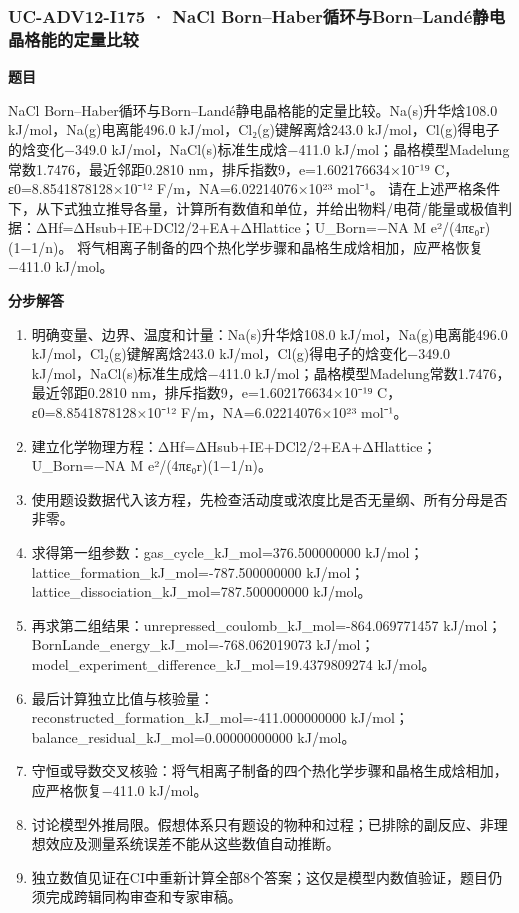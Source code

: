 \documentclass[UTF8,11pt,a4paper]{ctexart}
\begin{document}
\subsubsection*{UC-ADV12-I175 · NaCl Born–Haber循环与Born–Landé静电晶格能的定量比较}
\noindent\textbf{题目}\par
NaCl Born–Haber循环与Born–Landé静电晶格能的定量比较。Na(s)升华焓108.0 kJ/mol，Na(g)电离能496.0 kJ/mol，Cl₂(g)键解离焓243.0 kJ/mol，Cl(g)得电子的焓变化−349.0 kJ/mol，NaCl(s)标准生成焓−411.0 kJ/mol；晶格模型Madelung常数1.7476，最近邻距0.2810 nm，排斥指数9，e=1.602176634×10⁻¹⁹ C，ε0=8.8541878128×10⁻¹² F/m，NA=6.02214076×10²³ mol⁻¹。 请在上述严格条件下，从下式独立推导各量，计算所有数值和单位，并给出物料/电荷/能量或极值判据：ΔHf=ΔHsub+IE+DCl2/2+EA+ΔHlattice；U\_Born=−NA M e²/(4πε₀r)(1−1/n)。 将气相离子制备的四个热化学步骤和晶格生成焓相加，应严格恢复−411.0 kJ/mol。\par
\medskip\noindent\textbf{分步解答}
\begin{enumerate}
\item 明确变量、边界、温度和计量：Na(s)升华焓108.0 kJ/mol，Na(g)电离能496.0 kJ/mol，Cl₂(g)键解离焓243.0 kJ/mol，Cl(g)得电子的焓变化−349.0 kJ/mol，NaCl(s)标准生成焓−411.0 kJ/mol；晶格模型Madelung常数1.7476，最近邻距0.2810 nm，排斥指数9，e=1.602176634×10⁻¹⁹ C，ε0=8.8541878128×10⁻¹² F/m，NA=6.02214076×10²³ mol⁻¹。
\item 建立化学物理方程：ΔHf=ΔHsub+IE+DCl2/2+EA+ΔHlattice；U\_Born=−NA M e²/(4πε₀r)(1−1/n)。
\item 使用题设数据代入该方程，先检查活动度或浓度比是否无量纲、所有分母是否非零。
\item 求得第一组参数：gas\_cycle\_kJ\_mol=376.500000000 kJ/mol；lattice\_formation\_kJ\_mol=-787.500000000 kJ/mol；lattice\_dissociation\_kJ\_mol=787.500000000 kJ/mol。
\item 再求第二组结果：unrepressed\_coulomb\_kJ\_mol=-864.069771457 kJ/mol；BornLande\_energy\_kJ\_mol=-768.062019073 kJ/mol；model\_experiment\_difference\_kJ\_mol=19.4379809274 kJ/mol。
\item 最后计算独立比值与核验量：reconstructed\_formation\_kJ\_mol=-411.000000000 kJ/mol；balance\_residual\_kJ\_mol=0.00000000000 kJ/mol。
\item 守恒或导数交叉核验：将气相离子制备的四个热化学步骤和晶格生成焓相加，应严格恢复−411.0 kJ/mol。
\item 讨论模型外推局限。假想体系只有题设的物种和过程；已排除的副反应、非理想效应及测量系统误差不能从这些数值自动推断。
\item 独立数值见证在CI中重新计算全部8个答案；这仅是模型内数值验证，题目仍须完成跨辑同构审查和专家审稿。
\end{enumerate}
\end{document}
